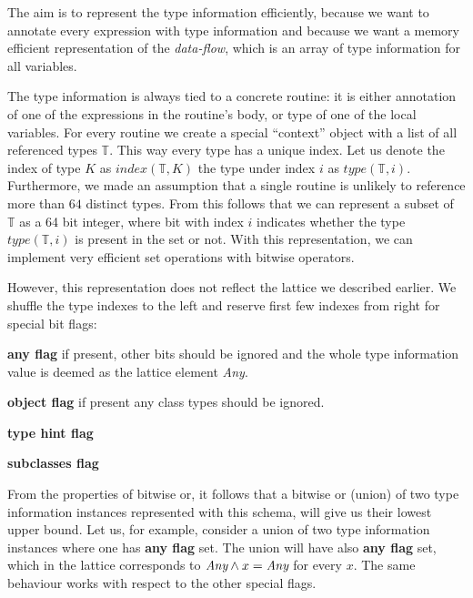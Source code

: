        The aim is to represent the type information efficiently, 
        because we want to annotate every expression with type 
        information and because we want a memory efficient 
        representation of the \emph{data-flow}, which is an 
        array of type information for all variables.
        
        The type information is always tied to a concrete routine: 
        it is either annotation of one of the expressions in 
        the routine's body, or type of one of the local variables. 
        For every routine we create a special ``context'' object 
        with a list of all referenced types $\mathbb{T}$. This way 
        every type has a unique index. Let us denote the index 
        of type $K$ as $\mathit{index}(\mathbb{T}, K)$ the 
        type under index $i$ as $\mathit{type}(\mathbb{T}, i)$.
        Furthermore, we made an assumption that a single routine 
        is unlikely to reference more than $64$ distinct types. 
        From this follows that we can represent a subset of 
        $\mathbb{T}$ as a 64 bit integer, where bit with index 
        $i$ indicates whether the type $\mathit{type}(\mathbb{T}, i)$ 
        is present in the set or not. With this representation, 
        we can implement very efficient set operations with 
        bitwise operators.
        
        However, this representation does not reflect the 
        lattice we described earlier. We shuffle 
        the type indexes to the left and reserve first few 
        indexes from right for special bit flags:
        
        \begin{itemize*}
            \item\textbf{any flag} if present, other bits should be ignored and the whole 
                type information value is deemed as the lattice element \emph{Any}.            
            \item\textbf{object flag} if present any class types should be ignored.
            \item\textbf{type hint flag}
            \item\textbf{subclasses flag}
        \end{itemize*}
        
        From the properties of bitwise or, it follows that 
        a bitwise or (union) of two type information instances 
        represented with this schema, will give us their 
        lowest upper bound. Let us, for example, consider 
        a union of two type information instances where one 
        has \textbf{any flag} set. The union will have 
        also \textbf{any flag} set, which in the lattice 
        corresponds to $\emph{Any}\wedge{}x=\emph{Any}$ 
        for every $x$. The same behaviour works with 
        respect to the other special flags.
        
